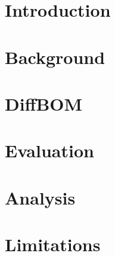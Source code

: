 \section{Introduction}
\label{sec:introduction}


\section{Background}
\label{sec:background}


\section{DiffBOM}
\label{sec:diffbom}


\section{Evaluation}
\label{sec:evaluation}


\section{Analysis}
\label{sec:analysis}



\section{Limitations}
\label{sec:analysis}






